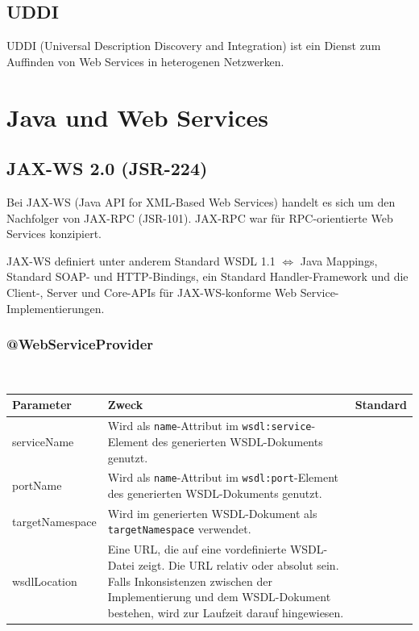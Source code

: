 \documentclass[runningheads]{llncs}
\newcommand{\germanquote}[1]{\glqq{}#1\grqq{}}
\newcommand{\anntabwidth}{\textwidth}
\begin{document}
  \label{uddi}
  \subsection{UDDI}
    UDDI\cite{wk_uddi} (Universal Description Discovery and Integration) ist ein Dienst zum Auffinden von Web Services in heterogenen Netzwerken.


  \label{wsj}
  \section{Java und Web Services}


  \label{jsr224}
  \subsection{JAX-WS 2.0 (JSR-224)}
    Bei JAX-WS\cite{jsr_224} (Java API for XML-Based Web Services) handelt es sich um den Nachfolger von JAX-RPC (JSR-101). JAX-RPC war für RPC-orientierte Web Services konzipiert.

    JAX-WS definiert unter anderem Standard WSDL 1.1 $\Leftrightarrow$ Java Mappings, Standard SOAP- und HTTP-Bindings, ein Standard Handler-Framework und die Client-, Server und Core-APIs für JAX-WS-konforme Web Service-Im\-ple\-men\-tier\-ung\-en.

    \subsubsection{@WebServiceProvider}\ \\
    \tymin=75pt
    \begin{tabulary}{\anntabwidth}{|l|L|L|}
    \hline
    \textbf{Parameter} & \textbf{Zweck} & \textbf{Standard} \\
    \hline
      serviceName &
      Wird als \texttt{name}-Attribut im \texttt{wsdl:service}-Element des generierten WSDL-\linebreak[0]Dokuments genutzt. &
      \germanquote{} \\
    \hline
      portName &
      Wird als \texttt{name}-Attribut im \texttt{wsdl:port}-Element des generierten WSDL-\linebreak[0]Dokuments genutzt. &
      \germanquote{} \\
    \hline
      targetNamespace &
      Wird im generierten WSDL-Dokument als \texttt{targetNamespace} verwendet. &
      \germanquote{} \\
    \hline
      wsdlLocation &
      Eine URL, die auf eine vordefinierte WSDL-Datei zeigt. Die URL relativ oder absolut sein. Falls Inkonsistenzen zwischen der Implementierung und dem WSDL-Dokument bestehen, wird zur Laufzeit darauf hingewiesen. &
      \germanquote{} \\
    \hline
    \end{tabulary}
    \tymin=10pt
\end{document}
